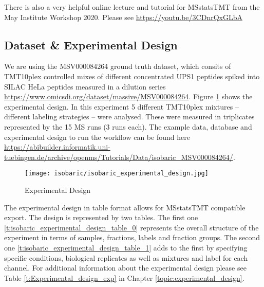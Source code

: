 \noindent There is also a very helpful online lecture and tutorial for MSstatsTMT from the May Institute Workshop 2020. Please see \url{https://youtu.be/3CDnrQxGLbA}

\subsection{Dataset \& Experimental Design}
We are using the MSV000084264 ground truth dataset, which consits of TMT10plex controlled mixes of different concentrated UPS1 peptides spiked into SILAC HeLa peptides measured in a dilution series \url{https://www.omicsdi.org/dataset/massive/MSV000084264}. Figure \ref{fig:isobaric_experimental_design} shows the experimental design. In this experiment 5 different TMT10plex mixtures -- different labeling strategies -- were analysed. These were measured in triplicates represented by the 15 MS runs (3 runs each). The example data, database and experimental design to run the workflow can be found here \url{https://abibuilder.informatik.uni-tuebingen.de/archive/openms/Tutorials/Data/isobaric_MSV000084264/}.

\begin{figure}[htbp]
  \centering
 \texttt{[image: isobaric/isobaric\_experimental\_design.jpg]}
  \caption{Experimental Design}
  \label{fig:isobaric_experimental_design}
\end{figure}
  
\noindent The experimental design in table format allows for MSstatsTMT compatible export. The design is represented by two tables. The first one \ref{t:isobaric_experimental_design_table_0} represents the overall structure of the experiment in terms of samples, fractions, labels and fraction groups. The second one \ref{t:isobaric_experimental_design_table_1} adds to the first by specifying specific conditions, biological replicates as well as mixtures and label for each channel. For additional information about the experimental design please see Table  \ref{t:Experimental_design_exp} in Chapter \ref{topic:experimental_design}. 

